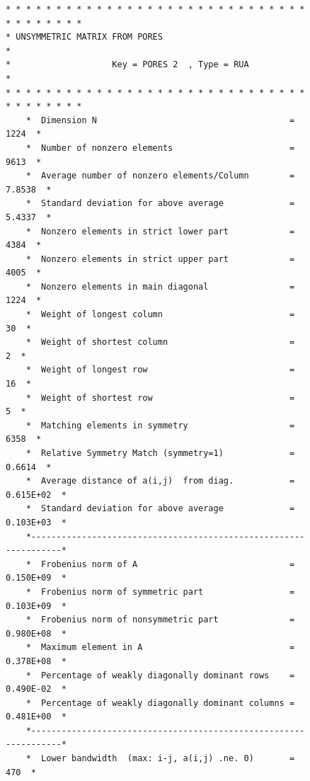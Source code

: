 \documentclass[12pt]{article}
\begin{document}
\begin{figure}
\begin{verbatim}
* * * * * * * * * * * * * * * * * * * * * * * * * * * * * * * * * * * * * *
* UNSYMMETRIC MATRIX FROM PORES                                           *
*                    Key = PORES 2  , Type = RUA                          *
* * * * * * * * * * * * * * * * * * * * * * * * * * * * * * * * * * * * * *
    *  Dimension N                                      =       1224  *
    *  Number of nonzero elements                       =       9613  *
    *  Average number of nonzero elements/Column        =     7.8538  *
    *  Standard deviation for above average             =     5.4337  *
    *  Nonzero elements in strict lower part            =       4384  *
    *  Nonzero elements in strict upper part            =       4005  *
    *  Nonzero elements in main diagonal                =       1224  *
    *  Weight of longest column                         =         30  *
    *  Weight of shortest column                        =          2  *
    *  Weight of longest row                            =         16  *
    *  Weight of shortest row                           =          5  *
    *  Matching elements in symmetry                    =       6358  *
    *  Relative Symmetry Match (symmetry=1)             =     0.6614  *
    *  Average distance of a(i,j)  from diag.           =  0.615E+02  *
    *  Standard deviation for above average             =  0.103E+03  *
    *-----------------------------------------------------------------*
    *  Frobenius norm of A                              =  0.150E+09  *
    *  Frobenius norm of symmetric part                 =  0.103E+09  *
    *  Frobenius norm of nonsymmetric part              =  0.980E+08  *
    *  Maximum element in A                             =  0.378E+08  *
    *  Percentage of weakly diagonally dominant rows    =  0.490E-02  *
    *  Percentage of weakly diagonally dominant columns =  0.481E+00  *
    *-----------------------------------------------------------------*
    *  Lower bandwidth  (max: i-j, a(i,j) .ne. 0)       =        470  *

\end{verbatim}
\end{figure}
\end{document}
